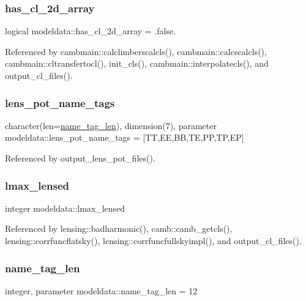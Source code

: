 \subsubsection{\texorpdfstring{has\+\_\+cl\+\_\+2d\+\_\+array}{has\_cl\_2d\_array}}
{\footnotesize\ttfamily logical modeldata\+::has\+\_\+cl\+\_\+2d\+\_\+array = .false.}



Referenced by cambmain\+::calclimberscalcls(), cambmain\+::calcscalcls(), cambmain\+::cltransfertocl(), init\+\_\+cls(), cambmain\+::interpolatecls(), and output\+\_\+cl\+\_\+files().

\mbox{\label{namespacemodeldata_ac4a0361c6d9a7692c9cbf7a08dc43e49}} 
\subsubsection{\texorpdfstring{lens\+\_\+pot\+\_\+name\+\_\+tags}{lens\_pot\_name\_tags}}
{\footnotesize\ttfamily character(len=\mbox{\hyperlink{namespacemodeldata_a2ead755d89390eb003edcde34ebf2c99}{name\+\_\+tag\+\_\+len}}), dimension(7), parameter modeldata\+::lens\+\_\+pot\+\_\+name\+\_\+tags = \mbox{[}\textquotesingle{}TT\textquotesingle{},\textquotesingle{}EE\textquotesingle{},\textquotesingle{}BB\textquotesingle{},\textquotesingle{}TE\textquotesingle{},\textquotesingle{}PP\textquotesingle{},\textquotesingle{}TP\textquotesingle{},\textquotesingle{}EP\textquotesingle{}\mbox{]}}



Referenced by output\+\_\+lens\+\_\+pot\+\_\+files().

\mbox{\label{namespacemodeldata_a538b61c12ebffc4e237d03392898a395}} 
\subsubsection{\texorpdfstring{lmax\+\_\+lensed}{lmax\_lensed}}
{\footnotesize\ttfamily integer modeldata\+::lmax\+\_\+lensed}



Referenced by lensing\+::badharmonic(), camb\+::camb\+\_\+getcls(), lensing\+::corrfuncflatsky(), lensing\+::corrfuncfullskyimpl(), and output\+\_\+cl\+\_\+files().

\mbox{\label{namespacemodeldata_a2ead755d89390eb003edcde34ebf2c99}} 
\subsubsection{\texorpdfstring{name\+\_\+tag\+\_\+len}{name\_tag\_len}}
{\footnotesize\ttfamily integer, parameter modeldata\+::name\+\_\+tag\+\_\+len = 12}

